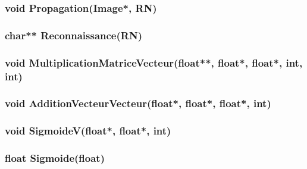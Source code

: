 \documentclass{article}
\begin{document}
		
		\subsubsection{\textcolor{myblue}{\textbf{void}} Propagation(\textcolor{myblue}{\textbf{Image*}}, \textcolor{myblue}{\textbf{RN}})}
		
		
		\subsubsection{\textcolor{myblue}{\textbf{char**}} Reconnaissance(\textcolor{myblue}{\textbf{RN}})}
		
		
		\subsubsection{\textcolor{myblue}{\textbf{void}} MultiplicationMatriceVecteur(\textcolor{myblue}{\textbf{float**}},  \textcolor{myblue}{\textbf{float*}},  \textcolor{myblue}{\textbf{float*}},  \textcolor{myblue}{\textbf{int}},  \textcolor{myblue}{\textbf{int}})}
		
		
		\subsubsection{\textcolor{myblue}{\textbf{void}} AdditionVecteurVecteur(\textcolor{myblue}{\textbf{float*}},  \textcolor{myblue}{\textbf{float*}},  \textcolor{myblue}{\textbf{float*}},  \textcolor{myblue}{\textbf{int}})}
		
		
		\subsubsection{\textcolor{myblue}{\textbf{void}} SigmoideV(\textcolor{myblue}{\textbf{float*}},  \textcolor{myblue}{\textbf{float*}},  \textcolor{myblue}{\textbf{int}})}
		
		
		\subsubsection{\textcolor{myblue}{\textbf{float}} Sigmoide(\textcolor{myblue}{\textbf{float}})}
		
		
		
\end{document}
